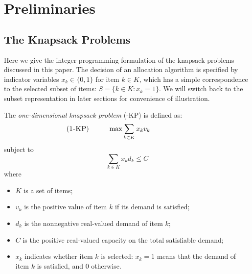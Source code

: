 \documentclass{aamas2013}
\begin{document}
\section{Preliminaries}\label{sec:prelim}
\noindent
\subsection{The Knapsack Problems}
\noindent
Here we give the integer programming formulation of the knapsack problems discussed in this paper.  The decision of an allocation algorithm is specified by indicator variables $x_k\in \{0,1\}$ for item $k\in K$, which has a simple correspondence to the selected subset of items: $S= \{k\in K: x_k=1\}$.  We will switch back to the subset representation in later sections for convenience of illustration. 

The {\em one-dimensional knapsack problem} ({-KP}) is defined as: \begin{equation*}
\begin{array}{@{}lc} \hspace{-50pt}
\mbox{({\sc 1-KP})} & \displaystyle \qquad \max \sum_{k \in K} x_k v_k \end{array}
\end{equation*}
subject to \begin{equation*}
\sum_{k \in K} x_k d_k \le C \end{equation*}
where 
\begin{itemize}

\item $K$ is a set of items;

\item $v_k$ is the positive value of item $k$ if its demand is satisfied;

\item $d_k$ is the nonnegative real-valued demand of item $k$;

\item $C$ is the positive real-valued capacity on the total satisfiable demand;

\item $x_k$ indicates whether item $k$ is selected: $x_k = 1$ means that the demand of item $k$ is satisfied, and 0 otherwise.

\end{itemize}
\end{document}

